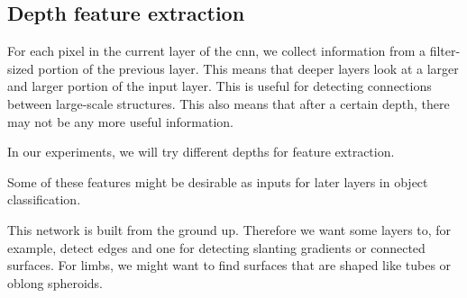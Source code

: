 
\subsection{Depth feature extraction}\label{subsec:depth_feature}
For each pixel in the current layer of the \gls{cnn}, we collect information from a filter-sized portion of the previous layer. This means that deeper layers look at a larger and larger portion of the input layer. This is useful for detecting connections between large-scale structures. This also means that after a certain depth, there may not be any more useful information.

In our experiments, we will try different depths for feature extraction.

Some of these features might be desirable as inputs for later layers in object classification.

This network is built from the ground up. Therefore we want some layers to, for example, detect edges and one for detecting slanting gradients or connected surfaces. For limbs, we might want to find surfaces that are shaped like tubes or oblong spheroids.

